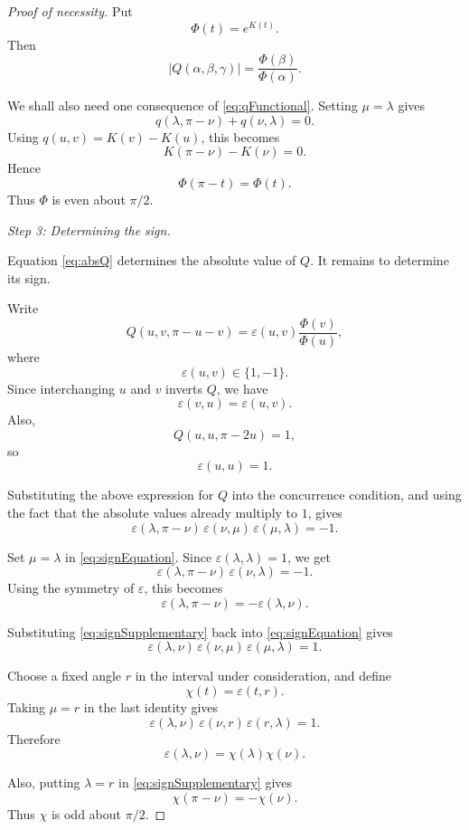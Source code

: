 \documentclass[12pt,a4paper]{amsart}
\theoremstyle{remark}
\begin{document}
\begin{proof}[Proof of necessity]
Put
\[
\Phi(t)=e^{K(t)}.
\]
Then
\begin{equation}
\label{eq:absQ}
\left|Q(\alpha,\beta,\gamma)\right|
=
\frac{\Phi(\beta)}{\Phi(\alpha)}.
\end{equation}

We shall also need one consequence of \eqref{eq:qFunctional}.  Setting
\(\mu=\lambda\) gives
\[
q(\lambda,\pi-\nu)+q(\nu,\lambda)=0.
\]
Using \(q(u,v)=K(v)-K(u)\), this becomes
\[
K(\pi-\nu)-K(\nu)=0.
\]
Hence
\[
\Phi(\pi-t)=\Phi(t).
\]
Thus \(\Phi\) is even about \(\pi/2\).

\emph{Step 3: Determining the sign.}

Equation \eqref{eq:absQ} determines the absolute value of \(Q\).  It remains to
determine its sign.

Write
\[
Q(u,v,\pi-u-v)
=
\varepsilon(u,v)\frac{\Phi(v)}{\Phi(u)},
\]
where
\[
\varepsilon(u,v)\in\{1,-1\}.
\]
Since interchanging \(u\) and \(v\) inverts \(Q\), we have
\[
\varepsilon(v,u)=\varepsilon(u,v).
\]
Also,
\[
Q(u,u,\pi-2u)=1,
\]
so
\[
\varepsilon(u,u)=1.
\]

Substituting the above expression for \(Q\) into the concurrence condition, and
using the fact that the absolute values already multiply to \(1\), gives
\begin{equation}
\label{eq:signEquation}
\varepsilon(\lambda,\pi-\nu)\,
\varepsilon(\nu,\mu)\,
\varepsilon(\mu,\lambda)
=
-1.
\end{equation}

Set \(\mu=\lambda\) in \eqref{eq:signEquation}.  Since
\(\varepsilon(\lambda,\lambda)=1\), we get
\[
\varepsilon(\lambda,\pi-\nu)\,\varepsilon(\nu,\lambda)=-1.
\]
Using the symmetry of \(\varepsilon\), this becomes
\begin{equation}
\label{eq:signSupplementary}
\varepsilon(\lambda,\pi-\nu)=-\varepsilon(\lambda,\nu).
\end{equation}

Substituting \eqref{eq:signSupplementary} back into
\eqref{eq:signEquation} gives
\[
\varepsilon(\lambda,\nu)\,
\varepsilon(\nu,\mu)\,
\varepsilon(\mu,\lambda)
=
1.
\]

Choose a fixed angle \(r\) in the interval under consideration, and define
\[
\chi(t)=\varepsilon(t,r).
\]
Taking \(\mu=r\) in the last identity gives
\[
\varepsilon(\lambda,\nu)\,\varepsilon(\nu,r)\,\varepsilon(r,\lambda)=1.
\]
Therefore
\[
\varepsilon(\lambda,\nu)=\chi(\lambda)\chi(\nu).
\]

Also, putting \(\lambda=r\) in \eqref{eq:signSupplementary} gives
\[
\chi(\pi-\nu)=-\chi(\nu).
\]
Thus \(\chi\) is odd about \(\pi/2\).


\end{proof}
\end{document}

